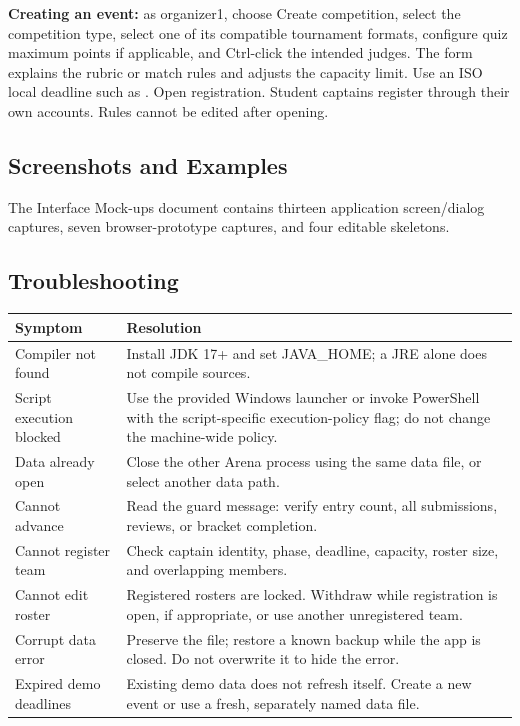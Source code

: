 \documentclass[12pt]{article}
\begin{document}
\textbf{Creating an event:} as organizer1, choose Create competition, select the competition type, select one of its compatible tournament formats, configure quiz maximum points if applicable, and Ctrl-click the intended judges. The form explains the rubric or match rules and adjusts the capacity limit. Use an ISO local deadline such as . Open registration. Student captains register through their own accounts. Rules cannot be edited after opening.
\clearpage\subsection{Screenshots and Examples}
The Interface Mock-ups document contains thirteen application screen/dialog captures, seven browser-prototype captures, and four editable skeletons.
\subsection{Troubleshooting}
\begin{tabularx}{\linewidth}{lY}\toprule Symptom & Resolution\\\midrule
Compiler not found & Install JDK 17+ and set JAVA\_HOME; a JRE alone does not compile sources.\\
Script execution blocked & Use the provided Windows launcher or invoke PowerShell with the script-specific execution-policy flag; do not change the machine-wide policy.\\
Data already open & Close the other Arena process using the same data file, or select another data path.\\
Cannot advance & Read the guard message: verify entry count, all submissions, reviews, or bracket completion.\\
Cannot register team & Check captain identity, phase, deadline, capacity, roster size, and overlapping members.\\
Cannot edit roster & Registered rosters are locked. Withdraw while registration is open, if appropriate, or use another unregistered team.\\
Corrupt data error & Preserve the file; restore a known backup while the app is closed. Do not overwrite it to hide the error.\\
Expired demo deadlines & Existing demo data does not refresh itself. Create a new event or use a fresh, separately named data file.\\\bottomrule\end{tabularx}
\end{document}
